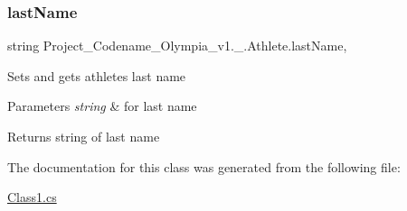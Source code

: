 \subsubsection{\texorpdfstring{last\+Name}{lastName}}
{\footnotesize\ttfamily string Project\+\_\+\+Codename\+\_\+\+Olympia\+\_\+v1.\+\_.\+Athlete.\+last\+Name\hspace{0.3cm}{\ttfamily [get]}, {\ttfamily [set]}}

Sets and gets athlete\textquotesingle{}s last name 
\begin{DoxyParams}{Parameters}
{\em string} & for last name \\
\hline
\end{DoxyParams}
\begin{DoxyReturn}{Returns}
string of last name 
\end{DoxyReturn}


The documentation for this class was generated from the following file\+:\begin{DoxyCompactItemize}
\item 
\hyperlink{Class1_8cs}{Class1.\+cs}\end{DoxyCompactItemize}
